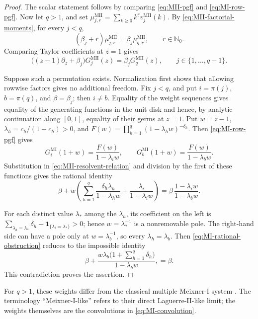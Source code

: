 \documentclass[10pt]{amsart}
\newcommand{\Nzero}{\mathbb N_0}
\newcommand{\fall}[2]{#1^{\underline{#2}}}
\theoremstyle{plain}
\theoremstyle{definition}
\theoremstyle{remark}
\begin{document}
\begin{proof}
The scalar statement follows by comparing \eqref{eq:MII-pgf} and
\eqref{eq:MI-row-pgf}. Now let \(q>1\), and set
\(\mu_{j,r}^{\mathrm{MII}}
=\sum_{k\ge0}\fall{k}{r}v_j^{\mathrm{MII}}(k)\).
By \eqref{eq:MII-factorial-moments}, for every \(j<q\),
\[
 (\beta_j+r)\mu_{j,r}^{\mathrm{MII}}
 =\beta_j\mu_{q,r}^{\mathrm{MII}},\qquad r\in\Nzero.
\]
Comparing Taylor coefficients at \(z=1\) gives
\begin{equation}
 \bigl((z-1)\partial_z+\beta_j\bigr)G_j^{\mathrm{MII}}(z)
 =\beta_jG_q^{\mathrm{MII}}(z),
 \qquad j\in\{1,\ldots,q-1\}.
 \label{eq:MII-resolvent-relation}
\end{equation}

Suppose such a permutation exists. Normalization first shows that allowing
rowwise factors gives no additional freedom. Fix \(j<q\), and put
\(i=\pi(j)\), \(b=\pi(q)\), and \(\beta=\beta_j\); then \(i\ne b\).
Equality of the weight sequences gives equality of the generating
functions in the unit disk and hence, by analytic continuation along
\([0,1]\), equality of their germs at \(z=1\).
Put \(w=z-1\), \(\lambda_h=c_h/(1-c_h)>0\), and
\(F(w)=\prod_{h=1}^q(1-\lambda_hw)^{-\delta_h}\). Then
\eqref{eq:MI-row-pgf} gives
\[
 G_i^{\mathrm{MI}}(1+w)=\frac{F(w)}{1-\lambda_iw},
 \qquad
 G_b^{\mathrm{MI}}(1+w)=\frac{F(w)}{1-\lambda_bw}.
\]
Substitution in \eqref{eq:MII-resolvent-relation} and division by the first
of these functions gives the rational identity
\begin{equation}
 \beta+
 w\left(
   \sum_{h=1}^q\frac{\delta_h\lambda_h}{1-\lambda_hw}
   +\frac{\lambda_i}{1-\lambda_iw}
 \right)
 =
 \beta\,\frac{1-\lambda_iw}{1-\lambda_bw}.
 \label{eq:MI-rational-obstruction}
\end{equation}

For each distinct value \(\lambda_*\) among the \(\lambda_h\), its
coefficient on the left is
\(\sum_{\lambda_h=\lambda_*}\delta_h+
\mathbf1_{\{\lambda_i=\lambda_*\}}>0\); hence
\(w=\lambda_*^{-1}\) is a nonremovable pole. The right-hand side can have
a pole only at \(w=\lambda_b^{-1}\), so every \(\lambda_h=\lambda_b\).
Then \eqref{eq:MI-rational-obstruction} reduces to the impossible identity
\[
 \beta+
 \frac{w\lambda_b\bigl(1+\sum_{h=1}^q\delta_h\bigr)}
      {1-\lambda_bw},
=\beta.
\]
This contradiction proves the assertion.
\end{proof}

For \(q>1\), these weights differ from the classical multiple Meixner-I
system
\cite{ArvesuCoussementVanAssche2003,
BranquinhoDiazFoulquieManasWolfs2024Discrete}.  The terminology
\enquote{Meixner-I-like} refers to their direct Laguerre-II-like limit;
the weights themselves are the convolutions in \eqref{eq:MI-convolution}.
\end{document}
